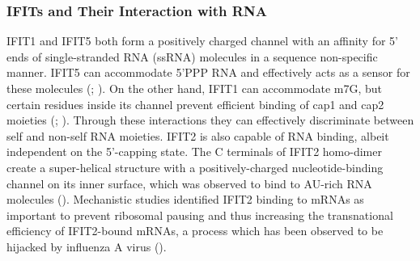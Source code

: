 \subsubsection{IFITs and Their Interaction with RNA} \label{IFITs and Their Interaction with RNA}
IFIT1 and IFIT5 both form a positively charged channel with an affinity for 5' ends of single-stranded RNA (ssRNA) molecules in a sequence non-specific manner. IFIT5 can accommodate 5'PPP RNA and effectively acts as a sensor for these molecules (\cite{Abbas2013StructuralProteins}; \cite{Pichlmair2011IFIT1RNA}). On the other hand, IFIT1 can accommodate m7G, but certain residues inside its channel prevent efficient binding of cap1 and cap2 moieties (\cite{Diamond2014IFIT1:Translation}; \cite{Mears2018BetterResponse}). Through these interactions they can effectively discriminate between self and non-self RNA moieties. IFIT2 is also capable of RNA binding, albeit independent on the 5'-capping state. The C terminals of IFIT2 homo-dimer create a super-helical structure with a positively-charged nucleotide-binding channel on its inner surface, which was observed to bind to AU-rich RNA molecules (\cite{Yang2012CrystalMechanisms}). Mechanistic studies identified IFIT2 binding to mRNAs as important to prevent ribosomal pausing and thus increasing the transnational efficiency of IFIT2-bound mRNAs, a process which has been observed to be hijacked by influenza A virus (\cite{Tran2020InfluenzaMRNAs}).

